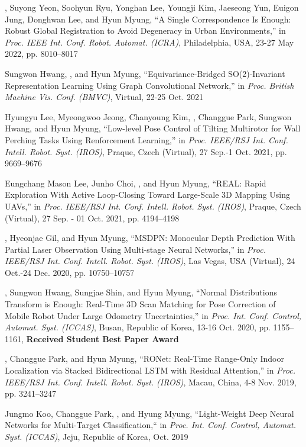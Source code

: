 \begin{pubSubsectionNum}
    \item \hyungtaelim, Suyong Yeon, Soohyun Ryu, Yonghan Lee, Youngji Kim, Jaeseong Yun, Euigon Jung, Donghwan Lee, and Hyun Myung, ``A Single Correspondence Is Enough: Robust Global Registration to Avoid Degeneracy in Urban Environments,'' in \textit{Proc. IEEE Int. Conf. Robot. Automat. (ICRA)}, Philadelphia, USA, 23-27 May 2022, pp. 8010--8017
    \item Sungwon Hwang, \hyungtaelim, and Hyun Myung, ``Equivariance-Bridged SO(2)-Invariant Representation Learning Using Graph Convolutional Network,'' in \textit{Proc. British Machine Vis. Conf. (BMVC)}, Virtual, 22-25 Oct. 2021
    \item Hyungyu Lee, Myeongwoo Jeong, Chanyoung Kim, \hyungtaelim, Changgue Park, Sungwon Hwang, and Hyun Myung, ``Low-level Pose Control of Tilting Multirotor for Wall Perching Tasks Using Renforcement Learning,'' in \textit{Proc. IEEE/RSJ Int. Conf. Intell. Robot. Syst. (IROS)}, Praque, Czech (Virtual), 27 Sep.-1 Oct. 2021, pp. 9669--9676
    \item Eungchang Mason Lee, Junho Choi, \hyungtaelim, and Hyun Myung, ``REAL: Rapid Exploration With Active Loop-Closing Toward Large-Scale 3D Mapping Using UAVs,'' in \textit{Proc. IEEE/RSJ Int. Conf. Intell. Robot. Syst. (IROS)}, Praque, Czech (Virtual), 27 Sep. - 01 Oct. 2021, pp. 4194--4198
    \item \hyungtaelim, Hyeonjae Gil, and Hyun Myung, ``MSDPN: Monocular Depth Prediction With Partial Laser Observation Using Multi-stage Neural Networks,'' in \textit{Proc. IEEE/RSJ Int. Conf. Intell. Robot. Syst. (IROS)}, Las Vegas, USA (Virtual), 24 Oct.-24 Dec. 2020, pp. 10750--10757
    \item \hyungtaelim, Sungwon Hwang, Sungjae Shin, and Hyun Myung, ``Normal Distributions Transform is Enough: Real-Time 3D Scan Matching for Pose Correction of Mobile Robot Under Large Odometry Uncertainties,'' in \textit{Proc. Int. Conf. Control, Automat. Syst. (ICCAS)}, Busan, Republic of Korea, 13-16 Oct. 2020, pp. 1155--1161, \textbf{Received Student Best Paper Award}
    \item \hyungtaelim, Changgue Park, and Hyun Myung, ``RONet: Real-Time Range-Only Indoor Localization via Stacked Bidirectional LSTM with Residual Attention,'' in \textit{Proc. IEEE/RSJ Int. Conf. Intell. Robot. Syst. (IROS)}, Macau, China, 4-8 Nov. 2019, pp. 3241--3247
    \item Jungmo Koo, Changgue Park, \hyungtaelim, and Hyung Myung, ``Light-Weight Deep Neural Networks for Multi-Target Classification,`` in \textit{Proc. Int. Conf. Control, Automat. Syst. (ICCAS)}, Jeju, Republic of Korea, Oct. 2019

\end{pubSubsectionNum}
